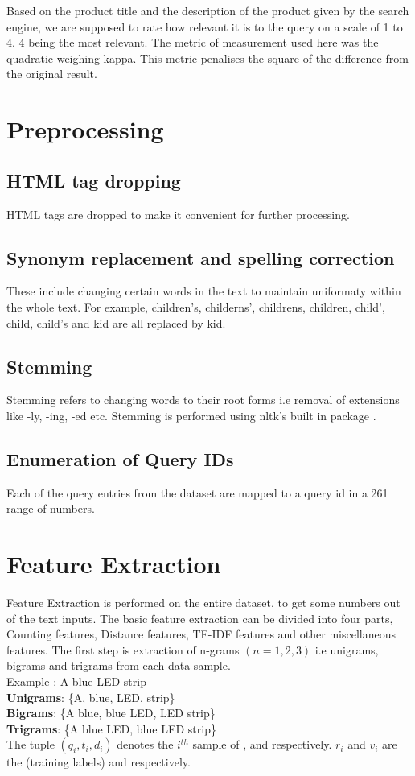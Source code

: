 \documentclass[BTech]{nitkdiss}
\begin{document}
Based on the product title and the description of the product given by the search engine, we are supposed to rate how relevant it is to the query on a scale of 1 to 4. 4 being the most relevant. The metric of measurement used here was the quadratic weighing kappa. This metric penalises the square of the difference from the original result.\\

\section{Preprocessing}
\subsection{HTML tag dropping}
HTML tags are dropped to make it convenient for further processing.
		
\subsection{Synonym replacement and spelling correction}
These include changing certain words in the text to maintain uniformaty within the whole text. For example, children's, childerns', childrens, children, child', child, child's and kid are all replaced by kid.

\subsection{Stemming}
Stemming refers to changing words to their root forms i.e removal of extensions like -ly, -ing, -ed etc. Stemming is performed using nltk's built in package .

\subsection{Enumeration of Query IDs}
Each of the query entries from the dataset are mapped to a query id in a 261 range of numbers.

\section{Feature Extraction}
Feature Extraction is performed on the entire dataset, to get some numbers out of the text inputs. The basic feature extraction can be divided into four parts, Counting features, Distance features, TF-IDF features and other miscellaneous features. The first step is extraction of n-grams $(n = {1, 2, 3})$ i.e unigrams, bigrams and trigrams from each data sample.\\
Example : {A blue LED strip}\\
\textbf{Unigrams}: \{A, blue, LED, strip\}\\
\textbf{Bigrams}: \{A blue, blue LED, LED strip\}\\
\textbf{Trigrams}: \{A blue LED, blue LED strip\}\\
The tuple $(q_i, t_i, d_i)$ denotes the $i^{th}$ sample of ,  and  respectively. $r_i$ and $v_i$ are the  (training labels) and  respectively.
\end{document}
